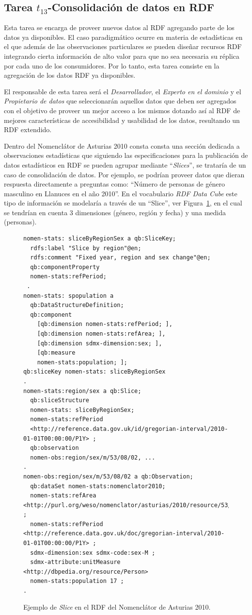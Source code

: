 \subsection{Tarea $t_{13}$-Consolidación de datos en RDF}
Esta tarea se encarga de proveer nuevos datos al \dataset RDF agregando parte de los datos ya disponibles. El caso
paradigmático ocurre en materia de estadísticas en el que además de las observaciones particulares se pueden
diseñar recursos \gls{RDF} integrando cierta información de alto valor para que no sea necesaria su réplica por 
cada uno de los consumidores. Por lo tanto, esta tarea consiste en la agregación de los datos RDF ya disponibles.

El responsable de esta tarea será el \textit{Desarrollador}, el \textit{Experto en el dominio} y el \textit{Propietario de datos} que seleccionarán
aquellos datos que deben ser agregados con el objetivo de proveer un mejor acceso a los mismos dotando así al \dataset
RDF de mejores características de accesibilidad y usabilidad de los datos, resultando un \dataset RDF extendido.

Dentro del Nomenclátor de Asturias 2010 consta consta una sección dedicada a observaciones estadísticas que siguiendo las especificaciones
para la publicación de datos estadísticos en RDF se pueden agrupar mediante ``\textit{Slices}'', se trataría de un caso de consolidación
de datos. Por ejemplo, se podrían proveer datos que dieran respuesta directamente a preguntas como: ``Número de personas de género masculino en Llanuces en el año 2010''.
En el vocabulario \textit{RDF Data Cube} este tipo de información se modelaría a través de un ``Slice'', ver Figura~\ref{fig:slice-nomen},
 en el cual se tendrían en cuenta 3 dimensiones (género, región y fecha) y una medida (personas).

\begin{figure}[!htp]
\begin{lstlisting} 
nomen-stats: sliceByRegionSex a qb:SliceKey;
  rdfs:label "Slice by region"@en;
  rdfs:comment "Fixed year, region and sex change"@en;
  qb:componentProperty
  nomen-stats:refPeriod; 
 .
nomen-stats: spopulation a
  qb:DataStructureDefinition;
  qb:component
    [qb:dimension nomen-stats:refPeriod; ],
    [qb:dimension nomen-stats:refArea; ],
    [qb:dimension sdmx-dimension:sex; ],
    [qb:measure
    nomen-stats:population; ];
qb:sliceKey nomen-stats: sliceByRegionSex
.
nomen-stats:region/sex a qb:Slice;
  qb:sliceStructure
  nomen-stats: sliceByRegionSex;
  nomen-stats:refPeriod
  <http://reference.data.gov.uk/id/gregorian-interval/2010-01-01T00:00:00/P1Y> ;
  qb:observation
  nomen-obs:region/sex/m/53/08/02, ...
.
nomen-obs:region/sex/m/53/08/02 a qb:Observation;
  qb:dataSet nomen-stats:nomenclator2010;
  nomen-stats:refArea <http://purl.org/weso/nomenclator/asturias/2010/resource/53/08/02> ;
  nomen-stats:refPeriod <http://reference.data.gov.uk/doc/gregorian-interval/2010-01-01T00:00:00/P1Y> ;
  sdmx-dimension:sex sdmx-code:sex-M ;
  sdmx-attribute:unitMeasure <http://dbpedia.org/resource/Person>
  nomen-stats:population 17 ; 
.
\end{lstlisting}
	\caption{Ejemplo de \textit{Slice} en el \dataset RDF del Nomenclátor de Asturias 2010.}
	\label{fig:slice-nomen}
\end{figure}

